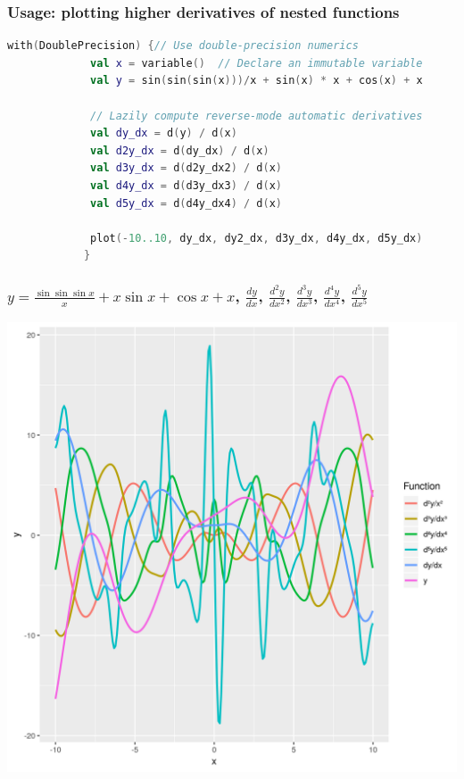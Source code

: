 \documentclass{beamer}
\begin{document}
    \begin{frame}[fragile]
        \frametitle{Usage: plotting higher derivatives of nested functions}
        \begin{lstlisting}[language=Kotlin, gobble=12]
            with(DoublePrecision) {// Use double-precision numerics
             val x = variable()  // Declare an immutable variable
             val y = sin(sin(sin(x)))/x + sin(x) * x + cos(x) + x

             // Lazily compute reverse-mode automatic derivatives
             val dy_dx = d(y) / d(x)
             val d2y_dx = d(dy_dx) / d(x)
             val d3y_dx = d(d2y_dx2) / d(x)
             val d4y_dx = d(d3y_dx3) / d(x)
             val d5y_dx = d(d4y_dx4) / d(x)

             plot(-10..10, dy_dx, dy2_dx, d3y_dx, d4y_dx, d5y_dx)
            }
        \end{lstlisting}
    \end{frame}

    \begin{frame}
        \frametitle{$y = \frac{\sin{\sin{\sin{x}}}}{x} + x \sin{x} + \cos{x} + x$, $\frac{dy}{dx}$, $\frac{d^{2}y}{dx^2}$, $\frac{d^{3}y}{dx^3}$, $\frac{d^{4}y}{dx^4}$, $\frac{d^{5}y}{dx^5}$}
        \begin{center}
            \includegraphics[scale=0.4]{plot.png}
        \end{center}
    \end{frame}
\end{document}
